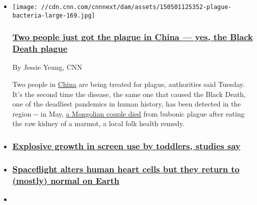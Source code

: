 \begin{itemize}
\item
  \href{/2019/11/13/health/china-plague-intl-hnk-scn-scli/index.html}{}

  \texttt{[image: //cdn.cnn.com/cnnnext/dam/assets/150501125352-plague-bacteria-large-169.jpg]}

  \hypertarget{two-people-just-got-the-plague-in-china--yes-the-black-death-plague}{%
  \subsubsection{\texorpdfstring{\href{/2019/11/13/health/china-plague-intl-hnk-scn-scli/index.html}{Two
  people just got the plague in China --- yes, the Black Death
  plague}}{Two people just got the plague in China --- yes, the Black Death plague}}\label{two-people-just-got-the-plague-in-china--yes-the-black-death-plague}}

  By Jessie Yeung, CNN

  Two people in \href{https://www.cnn.com/china/index.html}{China} are
  being treated for plague, authorities said Tuesday. It's the second
  time the disease, the same one that caused the Black Death, one of the
  deadliest pandemics in human history, has been detected in the region
  -\/- in May,
  \href{https://www.cnn.com/2019/05/08/health/bubonic-plague-explainer-trnd/index.html}{a
  Mongolian couple died} from bubonic plague after eating the raw kidney
  of a marmot, a local folk health remedy.
\item
  \hypertarget{explosive-growth-in-screen-use-by-toddlers-studies-say}{%
  \subsubsection{\texorpdfstring{\href{/2019/11/25/health/baby-toddler-screen-time-wellness/index.html}{Explosive
  growth in screen use by toddlers, studies
  say}}{Explosive growth in screen use by toddlers, studies say}}\label{explosive-growth-in-screen-use-by-toddlers-studies-say}}
\item
  \hypertarget{spaceflight-alters-human-heart-cells-but-they-return-to-mostly-normal-on-earth}{%
  \subsubsection{\texorpdfstring{\href{/2019/11/07/health/space-heart-cells-scn/index.html}{Spaceflight
  alters human heart cells but they return to (mostly) normal on
  Earth}}{Spaceflight alters human heart cells but they return to (mostly) normal on Earth}}\label{spaceflight-alters-human-heart-cells-but-they-return-to-mostly-normal-on-earth}}
\item
  \hypertarget{how-france-is-persuading-its-citizens-to-get-vaccinated}{%
}
\end{itemize}
